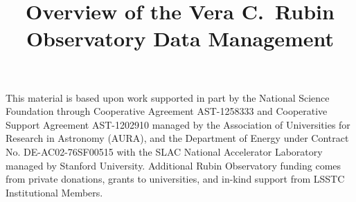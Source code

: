 \documentclass[twocolumn]{aastex631}
\begin{document}

\title{Overview of the Vera C.\ Rubin Observatory Data Management}






\begin{acknowledgments}
This material is based upon work supported in part by the National Science Foundation through Cooperative Agreement AST-1258333 and Cooperative Support Agreement AST-1202910 managed by the Association of Universities for Research in Astronomy (AURA), and the Department of Energy under Contract No. DE-AC02-76SF00515 with the SLAC National Accelerator Laboratory managed by Stanford University.
Additional Rubin Observatory funding comes from private donations, grants to universities, and in-kind support from LSSTC Institutional Members.
\end{acknowledgments}


\label{sec:bib}

\end{document}
